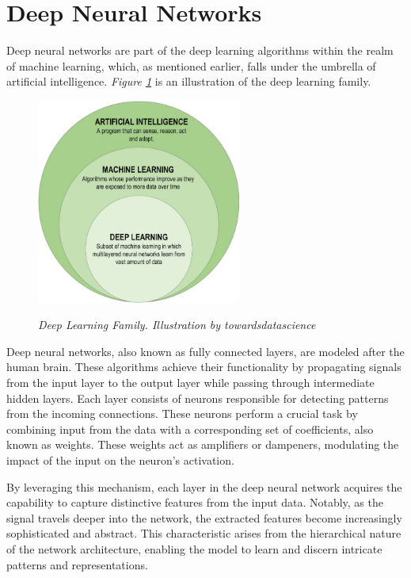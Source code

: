 \section{Deep Neural Networks}

Deep neural networks are part of the deep learning algorithms within the realm
of machine learning, which, as mentioned earlier, falls under the umbrella of
artificial intelligence. \textit{Figure \ref{fig:deep-learning-family}} is an
illustration of the deep learning family. \newline

\begin{figure}[H]
  \centering
  \includegraphics[width=0.6\textwidth]{imatges/preliminaries/deep-learning-familiy.png}
  \caption[Deep Learning Family]{\textit{Deep Learning Family. Illustration by towardsdatascience}}
  {\label{fig:deep-learning-family}}
\end{figure}

Deep neural networks, also known as fully connected layers, are modeled after
the human brain. These algorithms achieve their functionality by propagating
signals from the input layer to the output layer while passing through
intermediate hidden layers. Each layer consists of neurons responsible for
detecting patterns from the incoming connections. These neurons perform a
crucial task by combining input from the data with a corresponding set of
coefficients, also known as weights. These weights act as amplifiers or
dampeners, modulating the impact of the input on the neuron's activation.
\newline

By leveraging this mechanism, each layer in the deep neural network acquires
the capability to capture distinctive features from the input data. Notably, as
the signal travels deeper into the network, the extracted features become
increasingly sophisticated and abstract. This characteristic arises from the
hierarchical nature of the network architecture, enabling the model to learn
and discern intricate patterns and representations. \newline

